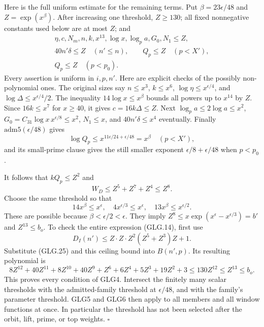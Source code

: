 Here is the full uniform estimate for the remaining terms.
Put \(\beta=23\epsilon/48\) and \(Z=\exp(x^\beta)\).
After increasing one threshold, \(Z\ge130\); all fixed
nonnegative constants used below are at most \(Z\); and
\[
 \begin{gathered}
 \eta,c,N_m,n,k,x^{13},\log x,\log_p a,G_0,N_1\le Z,\\
 40n'\delta\le Z\quad(n'\le n),\qquad Q_p\le Z\quad(p<X'),\\
 Q_p\le Z\quad(p<p_0).
 \end{gathered}                                                     \tag{GLG.25}
\]
Every assertion is uniform in \(i,p,n'\). Here are explicit
checks of the possibly non-polynomial ones. The original
sizes say \(n\le x^3\), \(k\le x^6\),
\(\log\eta\le x^{\epsilon/4}\), and
\(\log\Delta\le x^{\epsilon/4}/2\).
The inequality \(14\log x\le x^\beta\) bounds all powers
up to \(x^{14}\) by \(Z\). Since \(16k\le x^7\) for
\(x\ge40\), it gives \(c=16k\Delta\le Z\).
Next \(\log_pa\le2\log a\le x^2\),
\(G_0=C_{31}\log x\,x^{\epsilon/8}\le x^2\),
\(N_1\le x\), and \(40n'\delta\le x^4\) eventually.
Finally \(\mathrm{adm5}(\epsilon/48)\) gives
\[
 \log Q_p\le x^{11\epsilon/24+\epsilon/48}=x^\beta
       \quad(p<X'),
 \]
and its small-prime clause gives the still smaller exponent
\(\epsilon/8+\epsilon/48\) when \(p<p_0\).

It follows that \(kQ_p\le Z^2\) and
\[
         W_D\le Z^5+Z^7+Z^4\le Z^8 .
 \]
Choose the same threshold so that
\[
 14x^\beta\le x^\epsilon,\quad
 4x^{\epsilon/3}\le x^\epsilon,\quad
 13x^\beta\le x^{\epsilon/2}.
 \]
These are possible because \(\beta<\epsilon/2<\epsilon\).
They imply
\(Z^8\le x\exp(x^\epsilon-x^{\epsilon/3})=b'\) and
\(Z^{13}\le b_o\).
To check the entire expression (GLG.14), first use
\[
 D_I(n')\le
 Z\cdot Z\cdot Z^2(Z^5+Z^3)Z+1 .
 \]
Substitute (GLG.25) and this ceiling bound into \(B(n',p)\).
Its resulting polynomial is
\[
 8Z^{12}+40Z^{11}+8Z^{10}+40Z^9+Z^6
                     +6Z^4+5Z^3+19Z^2+3
          \le130Z^{12}\le Z^{13}\le b_o.                           \tag{GLG.26}
\]
This proves every condition of GLG4. Intersect the finitely many
scalar thresholds with the admitted-family threshold at
\(\epsilon/48\), and with the family's parameter threshold.
GLG5 and GLG6 then apply to all members and all window functions
at once. In particular the threshold has not been selected
after the orbit, lift, prime, or top weights.
\hfill\(\square\)

